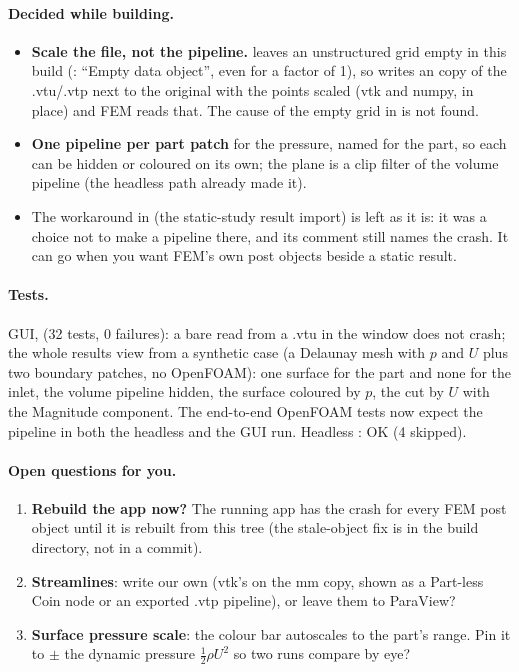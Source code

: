 \paragraph{Decided while building.}
\begin{itemize}[nosep]
  \item \textbf{Scale the file, not the pipeline.}  leaves an unstructured grid empty
        in this build (: ``Empty data object'', even for a factor of 1), so
         writes an  copy of the .vtu/.vtp next to the original with the points scaled
        (vtk and numpy, in place) and FEM reads that. The cause of the empty grid in  is not found.
  \item \textbf{One pipeline per part patch} for the pressure, named for the part, so each can be hidden or coloured on
        its own; the plane is a clip filter of the volume pipeline (the headless path already made it).
  \item The workaround in  (the static-study result import) is left as it is:
        it was a choice not to make a pipeline there, and its comment still names the crash. It can go when you want
        FEM's own post objects beside a static result.
\end{itemize}

\paragraph{Tests.} GUI,  (32 tests, 0 failures): a bare  read
from a .vtu in the window does not crash; the whole results view from a synthetic case (a Delaunay mesh with $p$ and
$U$ plus two boundary patches, no OpenFOAM): one surface for the part and none for the inlet, the volume pipeline
hidden, the surface coloured by $p$, the cut by $U$ with the Magnitude component. The end-to-end OpenFOAM tests now
expect the pipeline in both the headless and the GUI run. Headless : OK (4 skipped).

\paragraph{Open questions for you.}
\begin{enumerate}[nosep]
  \item \textbf{Rebuild the app now?} The running app has the crash for every FEM post object until it is rebuilt
        from this tree (the stale-object fix is in the build directory, not in a commit).
  \item \textbf{Streamlines}: write our own (vtk's  on the mm copy, shown as a Part-less
        Coin node or an exported .vtp pipeline), or leave them to ParaView?
  \item \textbf{Surface pressure scale}: the colour bar autoscales to the part's range. Pin it to $\pm$ the dynamic
        pressure $\tfrac12\rho U^2$ so two runs compare by eye?
\end{enumerate}
